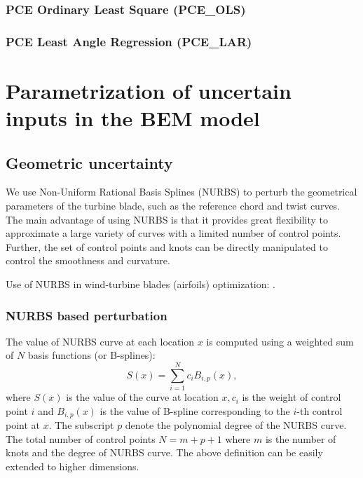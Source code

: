 \documentclass[review]{elsarticle}
\numberwithin{equation}{section}
\numberwithin{equation}{section}
\begin{document}
\subsubsection{PCE Ordinary Least Square (PCE\_OLS)}
\subsubsection{PCE Least Angle Regression (PCE\_LAR)}
\section{Parametrization of uncertain inputs in the BEM model}
\subsection{Geometric uncertainty}
We use Non-Uniform Rational Basis Splines (NURBS) \cite{rogers2000} to perturb the geometrical parameters of the turbine blade, such as the reference chord and twist curves. The main advantage of using NURBS is that it provides great flexibility to approximate a large variety of curves with a limited number of control points. Further, the set of control points and knots can be directly manipulated to control the smoothness and curvature.

Use of NURBS in wind-turbine blades (airfoils) optimization: \cite{Ribeiro2012,Bottasso2014}.

\subsubsection{NURBS based perturbation}
The value of NURBS curve at each location $x$ is computed using a weighted sum of $N$ basis functions (or B-splines):
\begin{equation}\label{NURB_curve}
S(x)  = \sum_{i=1}^{N} c_i B_{i,p}(x),
\end{equation}
where $S(x)$ is the value of the curve at location $x, c_i$ is the weight of control point $i$ and $B_{i,p}(x)$ is the value of B-spline corresponding to the $i$-th control point at $x$. The subscript $p$ denote the polynomial degree of the NURBS curve. The total number of control points $N = m+p+1$ where $m$ is the number of knots  and the degree of NURBS curve. The above definition can be easily extended to higher dimensions. 
\end{document}
